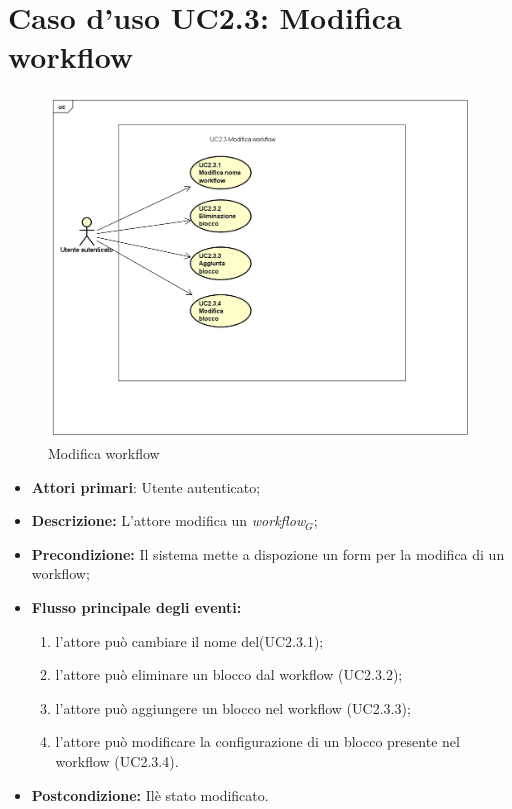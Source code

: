 		\section{Caso d'uso UC2.3: Modifica workflow}
		\begin{figure} [h]
			\centering
			\includegraphics[scale=0.4]{./Diagram/UC2-3.png}
			\caption{Modifica workflow }\label{}
		\end{figure}
		\begin{itemize}
			\item \textbf{Attori primari}: Utente autenticato;
			\item \textbf{Descrizione:} L'attore modifica un \textit{workflow$_{G}$};
			\item \textbf{Precondizione:} Il sistema mette a dispozione un form per la modifica di un workflow;
			\item \textbf{Flusso principale degli eventi:}
			\begin{enumerate}
				\item l'attore può cambiare il nome del(UC2.3.1);
				\item l'attore può eliminare un blocco dal workflow (UC2.3.2);
				\item l'attore può aggiungere un blocco nel workflow (UC2.3.3);
				\item l'attore può modificare la configurazione di un blocco presente nel workflow (UC2.3.4).
			\end{enumerate}
			\item \textbf{Postcondizione:} Ilè stato modificato.
		\end{itemize}
